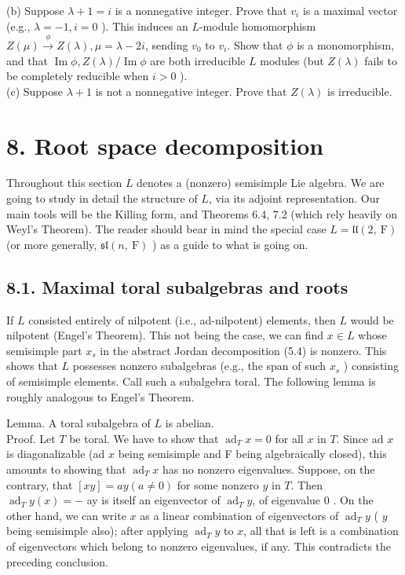 \documentclass[10pt]{article}
\begin{document}
\begin{enumerate}
(b) Suppose $\lambda+1=i$ is a nonnegative integer. Prove that $v_{i}$ is a maximal vector (e.g., $\lambda=-1, i=0$ ). This induces an $L$-module homomorphism $Z(\mu) \xrightarrow{\phi} Z(\lambda), \mu=\lambda-2 i$, sending $v_{0}$ to $v_{i}$. Show that $\phi$ is a monomorphism, and that $\operatorname{Im} \phi, Z(\lambda) / \operatorname{Im} \phi$ are both irreducible $L$ modules (but $Z(\lambda)$ fails to be completely reducible when $i>0$ ).\\
(c) Suppose $\lambda+1$ is not a nonnegative integer. Prove that $Z(\lambda)$ is irreducible.
\end{enumerate}

\section*{8. Root space decomposition}
Throughout this section $L$ denotes a (nonzero) semisimple Lie algebra. We are going to study in detail the structure of $L$, via its adjoint representation. Our main tools will be the Killing form, and Theorems 6.4, 7.2 (which rely heavily on Weyl's Theorem). The reader should bear in mind the special case $L=\mathfrak{l l}(2, \mathrm{~F})$ (or more generally, $\mathfrak{s l}(n, \mathrm{~F})$ ) as a guide to what is going on.

\subsection*{8.1. Maximal toral subalgebras and roots}
If $L$ consisted entirely of nilpotent (i.e., ad-nilpotent) elements, then $L$ would be nilpotent (Engel's Theorem). This not being the case, we can find $x \in L$ whose semisimple part $x_{s}$ in the abstract Jordan decomposition (5.4) is nonzero. This shows that $L$ possesses nonzero subalgebras (e.g., the span of such $x_{s}$ ) consisting of semisimple elements. Call such a subalgebra toral. The following lemma is roughly analogous to Engel's Theorem.

Lemma. A toral subalgebra of $L$ is abelian.\\
Proof. Let $T$ be toral. We have to show that $\operatorname{ad}_{T} x=0$ for all $x$ in $T$. Since ad $x$ is diagonalizable (ad $x$ being semisimple and F being algebraically closed), this amounts to showing that $\operatorname{ad}_{T} x$ has no nonzero eigenvalues. Suppose, on the contrary, that $[x y]=a y(a \neq 0)$ for some nonzero $y$ in $T$. Then $\operatorname{ad}_{T} y(x)=-$ ay is itself an eigenvector of $\operatorname{ad}_{T} y$, of eigenvalue 0 . On the other hand, we can write $x$ as a linear combination of eigenvectors of $\operatorname{ad}_{T} y$ ( $y$ being semisimple also); after applying $\operatorname{ad}_{T} y$ to $x$, all that is left is a combination of eigenvectors which belong to nonzero eigenvalues, if any. This contradicts the preceding conclusion.
\end{document}
